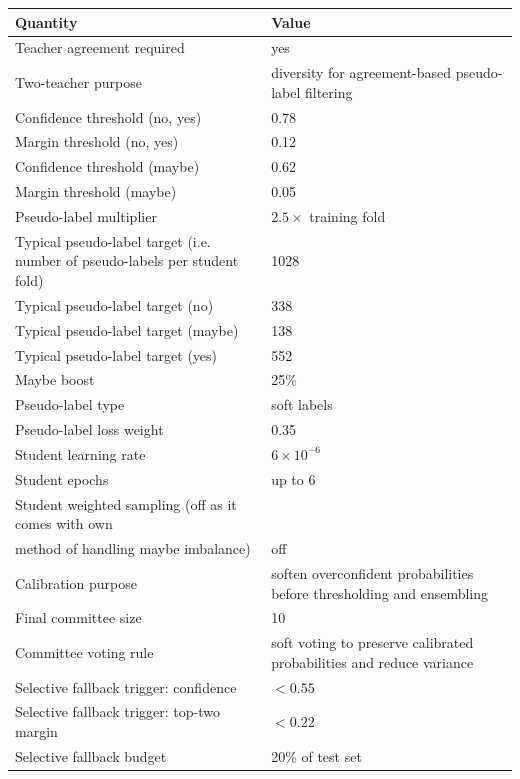 \FloatBarrier
\begin{table}[htbp]
\centering
\footnotesize
\setlength{\tabcolsep}{4pt}
\renewcommand{\arraystretch}{1.1}
\begin{tabularx}{\columnwidth}{|l|X|}
\hline
\textbf{Quantity} & \textbf{Value} \\
\hline
Teacher agreement required & yes \\
\hline
Two-teacher purpose & diversity for agreement-based pseudo-label filtering \\
\hline
Confidence threshold (no, yes) & 0.78 \\
\hline
Margin threshold (no, yes) & 0.12 \\
\hline
Confidence threshold (maybe) & 0.62 \\
\hline
Margin threshold (maybe) & 0.05 \\
\hline
Pseudo-label multiplier & $2.5\times$ training fold \\
\hline
Typical pseudo-label target (i.e. number of pseudo-labels per student fold) & 1028 \\
\hline
Typical pseudo-label target (no) & 338 \\
\hline
Typical pseudo-label target (maybe) & 138 \\
\hline
Typical pseudo-label target (yes) & 552 \\
\hline
Maybe boost & 25\% \\
\hline
Pseudo-label type & soft labels \\
\hline
Pseudo-label loss weight & 0.35 \\
\hline
Student learning rate & $6\times10^{-6}$ \\
\hline
Student epochs & up to 6 \\
\hline
Student weighted sampling (off as it comes with own \\ method of handling maybe imbalance)   & off \\
\hline
Calibration purpose & soften overconfident probabilities before thresholding and ensembling \\
\hline
Final committee size & 10 \\
\hline
Committee voting rule & soft voting to preserve calibrated probabilities and reduce variance \\
\hline
Selective fallback trigger: confidence & $<0.55$ \\
\hline
Selective fallback trigger: top-two margin & $<0.22$ \\
\hline
Selective fallback budget & 20\% of test set \\

\end{tabularx}
\end{table}
